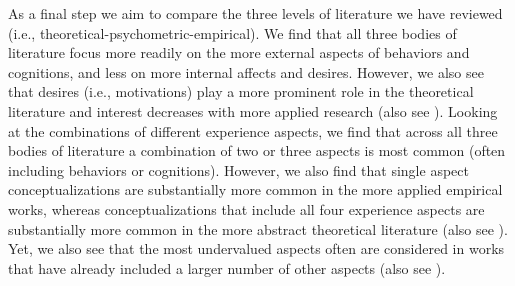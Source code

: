 As a final step we aim to compare the three levels of literature we have
reviewed (i.e., theoretical-psychometric-empirical). We find that all
three bodies of literature focus more readily on the more external
aspects of behaviors and cognitions, and less on more internal affects
and desires. However, we also see that desires (i.e., motivations) play
a more prominent role in the theoretical literature and interest
decreases with more applied research (also see
). Looking at the combinations of
different experience aspects, we find that across all three bodies of
literature a combination of two or three aspects is most common (often
including behaviors or cognitions). However, we also find that single
aspect conceptualizations are substantially more common in the more
applied empirical works, whereas conceptualizations that include all
four experience aspects are substantially more common in the more
abstract theoretical literature (also see
). Yet, we also see that the most
undervalued aspects often are considered in works that have already
included a larger number of other aspects (also see
).

\color{black}

